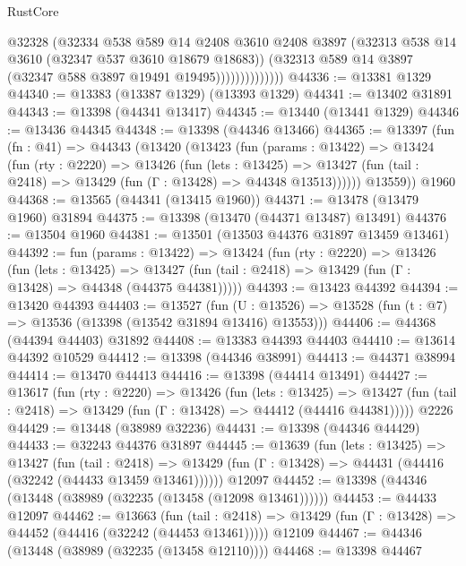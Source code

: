 \begin{lexlean}{RustCore}
\begin{coremodule}
                          @32328
                          (@32334
                            @538
                            @589
                            @14
                            @2408
                            @3610
                            @2408
                            @3897
                            (@32313 @538 @14 @3610 (@32347 @537 @3610 @18679 @18683))
                            (@32313 @589 @14 @3897 (@32347 @588 @3897 @19491 @19495))))))))))))))
@44336 := @13381 @1329
@44340 := @13383 (@13387 @1329) (@13393 @1329)
@44341 := @13402 @31891
@44343 := @13398 (@44341 @13417)
@44345 := @13440 (@13441 @1329)
@44346 := @13436 @44345
@44348 := @13398 (@44346 @13466)
@44365 := @13397
    (fun (fn : @41) =>
    @44343
      (@13420
        (@13423
          (fun (params : @13422) =>
          @13424
            (fun (rty : @2220) =>
            @13426
              (fun (lets : @13425) =>
              @13427 (fun (tail : @2418) => @13429 (fun (Γ : @13428) => @44348 @13513))))))
        @13559))
    @1960
@44368 := @13565 (@44341 (@13415 @1960))
@44371 := @13478 (@13479 @1960) @31894
@44375 := @13398 (@13470 (@44371 @13487) @13491)
@44376 := @13504 @1960
@44381 := @13501 (@13503 @44376 @31897 @13459 @13461)
@44392 := fun (params : @13422) =>
  @13424
    (fun (rty : @2220) =>
    @13426
      (fun (lets : @13425) =>
      @13427 (fun (tail : @2418) => @13429 (fun (Γ : @13428) => @44348 (@44375 @44381)))))
@44393 := @13423 @44392
@44394 := @13420 @44393
@44403 := @13527
    (fun (U : @13526) => @13528 (fun (t : @7) => @13536 (@13398 (@13542 @31894 @13416) @13553)))
@44406 := @44368 (@44394 @44403) @31892
@44408 := @13383 @44393 @44403
@44410 := @13614 @44392 @10529
@44412 := @13398 (@44346 @38991)
@44413 := @44371 @38994
@44414 := @13470 @44413
@44416 := @13398 (@44414 @13491)
@44427 := @13617
    (fun (rty : @2220) =>
    @13426
      (fun (lets : @13425) =>
      @13427 (fun (tail : @2418) => @13429 (fun (Γ : @13428) => @44412 (@44416 @44381)))))
    @2226
@44429 := @13448 (@38989 @32236)
@44431 := @13398 (@44346 @44429)
@44433 := @32243 @44376 @31897
@44445 := @13639
    (fun (lets : @13425) =>
    @13427
      (fun (tail : @2418) =>
      @13429 (fun (Γ : @13428) => @44431 (@44416 (@32242 (@44433 @13459 @13461))))))
    @12097
@44452 := @13398 (@44346 (@13448 (@38989 (@32235 (@13458 (@12098 @13461))))))
@44453 := @44433 @12097
@44462 := @13663
    (fun (tail : @2418) => @13429 (fun (Γ : @13428) => @44452 (@44416 (@32242 (@44453 @13461)))))
    @12109
@44467 := @44346 (@13448 (@38989 (@32235 (@13458 @12110))))
@44468 := @13398 @44467

\end{coremodule}
\end{lexlean}
